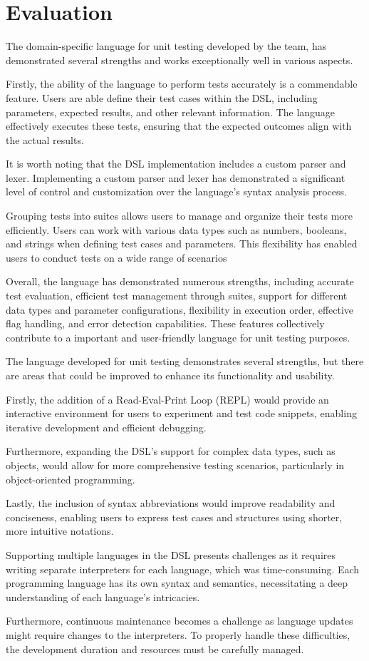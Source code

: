 \chapter{Evaluation}

The domain-specific language for unit testing developed by the team, has demonstrated several strengths and works exceptionally well in various aspects.

Firstly, the ability of the language to perform tests accurately is a commendable feature. Users are able define their test cases within the DSL, including parameters, expected results, and other relevant information. The language effectively executes these tests, ensuring that the expected outcomes align with the actual results.

It is worth noting that the DSL implementation includes a custom parser and lexer. Implementing a custom parser and lexer has demonstrated a significant level of control and customization over the language's syntax analysis process.

Grouping tests into suites allows users to manage and organize their tests more efficiently. Users can work with various data types such as numbers, booleans, and strings when defining test cases and parameters. This flexibility has enabled users to conduct tests on a wide range of scenarios

Overall, the language has demonstrated numerous strengths, including accurate test evaluation, efficient test management through suites, support for different data types and parameter configurations, flexibility in execution order, effective flag handling, and error detection capabilities. These features collectively contribute to a important and user-friendly language for unit testing purposes.

The language developed for unit testing demonstrates several strengths, but there are areas that could be improved to enhance its functionality and usability.

Firstly, the addition of a Read-Eval-Print Loop (REPL) would provide an interactive environment for users to experiment and test code snippets, enabling iterative development and efficient debugging. 

Furthermore, expanding the DSL's support for complex data types, such as objects, would allow for more comprehensive testing scenarios, particularly in object-oriented programming. 

Lastly, the inclusion of syntax abbreviations would improve readability and conciseness, enabling users to express test cases and structures using shorter, more intuitive notations. 

Supporting multiple languages in the DSL presents challenges as it requires writing separate interpreters for each language, which was time-consuming. Each programming language has its own syntax and semantics, necessitating a deep understanding of each language's intricacies.

Furthermore, continuous maintenance becomes a challenge as language updates might require changes to the interpreters. To properly handle these difficulties, the development duration and resources must be carefully managed.





